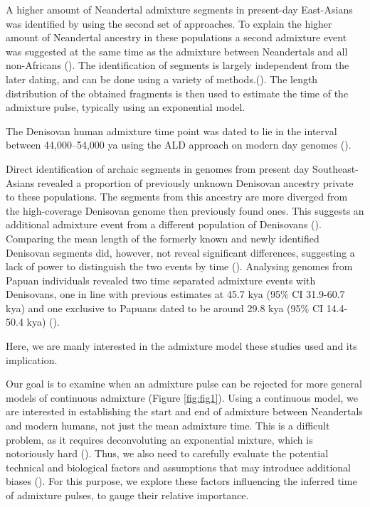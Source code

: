 \documentclass[]{article}
\begin{document}
A higher amount of Neandertal admixture segments in present-day East-Asians was identified by using the second set of approaches. To explain the higher amount of Neandertal ancestry in these populations a second admixture event was suggested at the same time as the admixture between Neandertals and
all non-Africans (\cite{kim_selection_2015,vernot_complex_2015}).  The identification of segments is largely independent from the later dating, and can be done using a variety of methods.(\cite{racimo_signatures_2017,seguin_orlando_paleogenomics_2014,vernot_excavating_2016,sankararaman_combined_2016,skov_detecting_2018}). The length distribution of the obtained fragments is then used to estimate the time of the admixture pulse, typically using an exponential model.

The Denisovan human
admixture time point was dated to lie in the interval between 44,000--54,000 ya using the ALD
approach on modern day genomes (\cite{sankararaman_combined_2016}).

Direct identification of archaic segments in genomes from present day Southeast-Asians revealed a proportion of previously unknown Denisovan ancestry private to these populations. The segments from this ancestry are more diverged from the high-coverage Denisovan genome then previously found ones. This suggests an additional admixture event from a different population of Denisovans (\cite{browning_analysis_2018}).
Comparing the mean length of the formerly known and newly identified Denisovan segments did, however, not reveal
significant differences, suggesting a lack of power to distinguish the
two events by time (\cite{browning_analysis_2018,jacobs_multiple_2019}).
Analysing genomes from Papuan individuals revealed two time separated
admixture events with Denisovans, one in line with previous estimates at
45.7 kya (95\% CI 31.9-60.7 kya) and one exclusive to Papuans dated to
be around 29.8 kya (95\% CI 14.4-50.4 kya)
(\cite{jacobs_multiple_2019}).

Here, we are manly interested in the admixture model these studies used and its implication.

Our goal is to examine when an admixture pulse can be rejected for more general models of continuous admixture (Figure \ref{fig:fig1}).  Using a continuous model, we are interested in establishing the start and end of admixture between Neandertals and modern humans, not just the mean admixture time. This is a difficult problem, as it requires deconvoluting an exponential mixture, which is notoriously hard (\cite{dasgupta_mixture_2008}). Thus, we also need to carefully evaluate the potential technical and biological factors and assumptions that may introduce additional biases (\cite{pool_inference_2009,gravel_population_2012,liang_lengths_2014}).
For this purpose, we explore these factors influencing the inferred time of admixture pulses, to gauge their relative importance.
\end{document}
